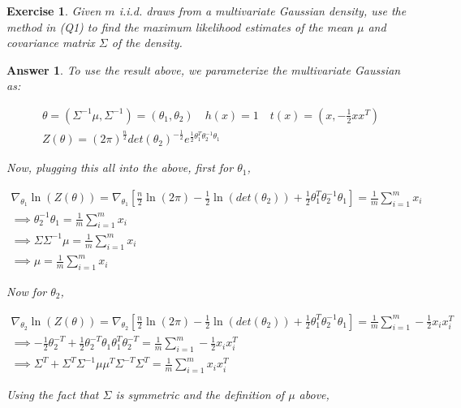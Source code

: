 \documentclass[12pt]{article}
\theoremstyle{colon}
\newtheorem{exercise}{Exercise}
\newtheorem*{answer}{Answer}
\begin{document}
\clearpage

\begin{exercise}
  Given $m$ i.i.d. draws from a multivariate Gaussian density, use the method in (Q1) to find the maximum likelihood estimates of the mean $\mu$ and covariance matrix $\Sigma$ of the density.
\end{exercise}

\begin{answer}
  To use the result above, we parameterize the multivariate Gaussian as:

  \begin{gather*}
    \theta = (\Sigma^{-1} \mu, \Sigma^{-1}) = (\theta_1, \theta_2) \quad h(x) = 1 \quad t(x) = (x, -\frac{1}{2} x x^T) \\
    Z(\theta) = (2 \pi)^{\frac{n}{2}} det(\theta_2)^{-\frac{1}{2}} e^{\frac{1}{2} \theta_1^T \theta_2^{-1} \theta_1}
  \end{gather*}

  Now, plugging this all into the above, first for $\theta_1$,

  \begin{gather*}
    \nabla_{\theta_1} \ln(Z(\theta)) = \nabla_{\theta_1} \left[ \frac{n}{2} \ln(2 \pi) - \frac{1}{2} \ln(det(\theta_2)) + \frac{1}{2} \theta_1^T \theta_2^{-1} \theta_1 \right] = \frac{1}{m} \sum_{i=1}^m x_i \\
    \implies \theta_2^{-1} \theta_1 = \frac{1}{m} \sum_{i=1}^m x_i \\
    \implies \Sigma \Sigma^{-1} \mu = \frac{1}{m} \sum_{i=1}^m x_i \\
    \implies \mu = \frac{1}{m} \sum_{i=1}^m x_i
  \end{gather*}

  Now for $\theta_2$,

  \begin{gather*}
    \nabla_{\theta_2} \ln(Z(\theta)) = \nabla_{\theta_2} \left[ \frac{n}{2} \ln(2 \pi) - \frac{1}{2} \ln(det(\theta_2)) + \frac{1}{2} \theta_1^T \theta_2^{-1} \theta_1 \right] = \frac{1}{m} \sum_{i=1}^m -\frac{1}{2} x_i x_i^T \\
    \implies -\frac{1}{2} \theta_2^{-T} + \frac{1}{2} \theta_2^{-T} \theta_1 \theta_1^T \theta_2^{-T}= \frac{1}{m} \sum_{i=1}^m -\frac{1}{2} x_i x_i^T \\
    \implies \Sigma^{T} + \Sigma^{T} \Sigma^{-1} \mu \mu^T \Sigma^{-T} \Sigma^{T} = \frac{1}{m} \sum_{i=1}^m x_i x_i^T
  \end{gather*}

  Using the fact that $\Sigma$ is symmetric and the definition of $\mu$ above,


\end{answer}
\end{document}
